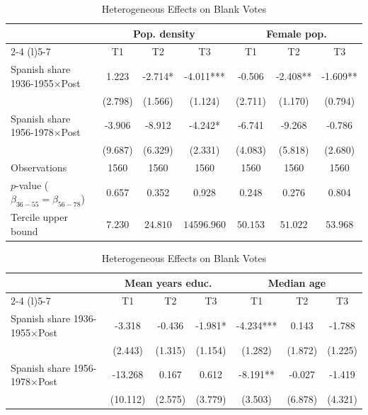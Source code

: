 \begin{table}[!h]
\centering
\renewcommand{\arraystretch}{1.05}
\setlength{\tabcolsep}{6pt}
\captionsetup{justification=centering}
\caption{Heterogeneous Effects on Blank Votes}
\begin{tabular*}{\textwidth}{l@{\extracolsep{\fill}}cccccc}
\hline
 & \multicolumn{3}{c}{Pop. density} & \multicolumn{3}{c}{Female pop.} \\
\cmidrule(l){2-4} \cmidrule(l){5-7}
  & T1 & T2 & T3 & T1  & T2  & T3 \\
\hline
Spanish share 1936-1955$\times$Post & 1.223 & -2.714* & -4.011*** & -0.506 & -2.408** & -1.609**\\
 & (2.798) & (1.566) & (1.124) & (2.711) & (1.170) & (0.794)\\
Spanish share 1956-1978$\times$Post & -3.906 & -8.912 & -4.242* & -6.741 & -9.268 & -0.786\\
 & (9.687) & (6.329) & (2.331) & (4.083) & (5.818) & (2.680)\\

\addlinespace
Observations & 1560 & 1560 & 1560 & 1560 & 1560 & 1560\\
$p$-value ($\beta_{36{-}55} = \beta_{56{-}78}$) & 0.657 & 0.352 & 0.928 & 0.248 & 0.276 & 0.804\\
Tercile upper bound & $7.230$ & $24.810$ & $14596.960$ & $50.153$ & $51.022$ & $53.968$\\
\hline
\end{tabular*}
\begin{tabular*}{\textwidth}{l@{\extracolsep{\fill}}cccccc}
 & \multicolumn{3}{c}{Mean years educ.} & \multicolumn{3}{c}{Median age} \\
\cmidrule(l){2-4} \cmidrule(l){5-7}
  & T1 & T2 & T3 & T1  & T2  & T3 \\
\hline
Spanish share 1936-1955$\times$Post & -3.318 & -0.436 & -1.981* & -4.234*** & 0.143 & -1.788\\
 & (2.443) & (1.315) & (1.154) & (1.282) & (1.872) & (1.225)\\
Spanish share 1956-1978$\times$Post & -13.268 & 0.167 & 0.612 & -8.191** & -0.027 & -1.419\\
 & (10.112) & (2.575) & (3.779) & (3.503) & (6.878) & (4.321)\\


\end{tabular*}
\end{table}
